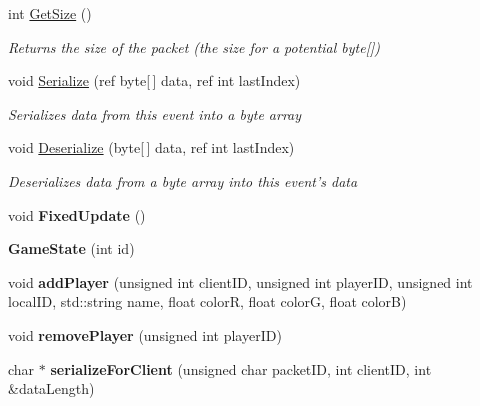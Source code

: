 \begin{DoxyCompactItemize}
\item 
int \hyperlink{class_game_state_a57d152b243c11aa86e7ba0f07b4bd0dd}{Get\-Size} ()
\begin{DoxyCompactList}\small\item\em Returns the size of the packet (the size for a potential byte\mbox{[}\mbox{]}) \end{DoxyCompactList}\item 
void \hyperlink{class_game_state_af57a06c77a763e8b57841bab79c9b12f}{Serialize} (ref byte\mbox{[}$\,$\mbox{]} data, ref int last\-Index)
\begin{DoxyCompactList}\small\item\em Serializes data from this event into a byte array \end{DoxyCompactList}\item 
void \hyperlink{class_game_state_aa5f956de2c49182fbe5fc32e9d2ca431}{Deserialize} (byte\mbox{[}$\,$\mbox{]} data, ref int last\-Index)
\begin{DoxyCompactList}\small\item\em Deserializes data from a byte array into this event's data \end{DoxyCompactList}\item 
\hypertarget{class_game_state_a268b639f06e4fa7fa1ca1819cc5d3175}{void {\bfseries Fixed\-Update} ()}\label{class_game_state_a268b639f06e4fa7fa1ca1819cc5d3175}

\item 
\hypertarget{class_game_state_a74a35fb7045c0eee7e68f07c387e2ddf}{{\bfseries Game\-State} (int id)}\label{class_game_state_a74a35fb7045c0eee7e68f07c387e2ddf}

\item 
\hypertarget{class_game_state_ad74bf5767b052d5b32805220ca0c1fab}{void {\bfseries add\-Player} (unsigned int client\-I\-D, unsigned int player\-I\-D, unsigned int local\-I\-D, std\-::string name, float color\-R, float color\-G, float color\-B)}\label{class_game_state_ad74bf5767b052d5b32805220ca0c1fab}

\item 
\hypertarget{class_game_state_a733fa68895adba783b0b4b804f16906f}{void {\bfseries remove\-Player} (unsigned int player\-I\-D)}\label{class_game_state_a733fa68895adba783b0b4b804f16906f}

\item 
\hypertarget{class_game_state_a291fcda337b1a25c21871fe338399c27}{char $\ast$ {\bfseries serialize\-For\-Client} (unsigned char packet\-I\-D, int client\-I\-D, int \&data\-Length)}\label{class_game_state_a291fcda337b1a25c21871fe338399c27}

\end{DoxyCompactItemize}
